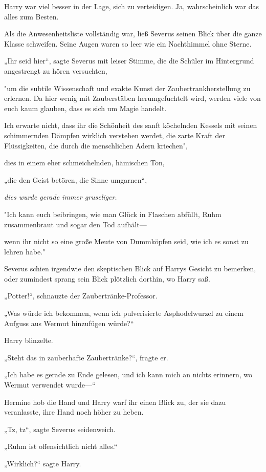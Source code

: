 {Harry war viel besser in der Lage, sich zu verteidigen. Ja, wahrscheinlich war das alles zum Besten.

Als die Anwesenheitsliste vollständig war, ließ Severus seinen Blick über die ganze Klasse schweifen. Seine Augen waren so leer wie ein Nachthimmel ohne Sterne.

„Ihr seid hier“, sagte Severus mit leiser Stimme, die die Schüler im Hintergrund angestrengt zu hören versuchten,

"um die subtile Wissenschaft und exakte Kunst der Zaubertrankherstellung zu erlernen. Da hier wenig mit Zauberstäben herumgefuchtelt wird, werden viele von euch kaum glauben, dass es sich um Magie handelt.

Ich erwarte nicht, dass ihr die Schönheit des sanft köchelnden Kessels mit seinen schimmernden Dämpfen wirklich verstehen werdet, die zarte Kraft der Flüssigkeiten, die durch die menschlichen Adern kriechen",

dies in einem eher schmeichelnden, hämischen Ton,

„die den Geist betören, die Sinne umgarnen“,

\emph{dies wurde gerade immer gruseliger.}

"Ich kann euch beibringen, wie man Glück in Flaschen abfüllt, Ruhm zusammenbraut und sogar den Tod aufhält—

wenn ihr nicht so eine große Meute von Dummköpfen seid, wie ich es sonst zu lehren habe."

Severus schien irgendwie den skeptischen Blick auf Harrys Gesicht zu bemerken, oder zumindest sprang sein Blick plötzlich dorthin, wo Harry saß.

„Potter!“, schnauzte der Zaubertränke-Professor.

„Was würde ich bekommen, wenn ich pulverisierte Asphodelwurzel zu einem Aufguss aus Wermut hinzufügen würde?“

Harry blinzelte.

„Steht das in zauberhafte Zaubertränke?“, fragte er.

„Ich habe es gerade zu Ende gelesen, und ich kann mich an nichts erinnern, wo Wermut verwendet wurde—“

Hermine hob die Hand und Harry warf ihr einen Blick zu, der sie dazu veranlasste, ihre Hand noch höher zu heben.

„Tz, tz“, sagte Severus seidenweich.

„Ruhm ist offensichtlich nicht alles.“

„Wirklich?“ sagte Harry.

}
